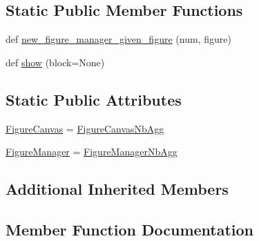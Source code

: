 \subsection*{Static Public Member Functions}
\begin{DoxyCompactItemize}
\item 
def \hyperlink{classmatplotlib_1_1backends_1_1backend__nbagg_1_1__BackendNbAgg_a2c4d1f5d23f896962ac1e1820966e93a}{new\+\_\+figure\+\_\+manager\+\_\+given\+\_\+figure} (num, figure)
\item 
def \hyperlink{classmatplotlib_1_1backends_1_1backend__nbagg_1_1__BackendNbAgg_aa50af96a7824c694dc620ac08db3de1b}{show} (block=None)
\end{DoxyCompactItemize}
\subsection*{Static Public Attributes}
\begin{DoxyCompactItemize}
\item 
\hyperlink{classmatplotlib_1_1backends_1_1backend__nbagg_1_1__BackendNbAgg_ad89ee8826e88ff62437efb785aa1bbad}{Figure\+Canvas} = \hyperlink{classmatplotlib_1_1backends_1_1backend__nbagg_1_1FigureCanvasNbAgg}{Figure\+Canvas\+Nb\+Agg}
\item 
\hyperlink{classmatplotlib_1_1backends_1_1backend__nbagg_1_1__BackendNbAgg_a9c885cb676b77a6ac7baedf4ecbb7218}{Figure\+Manager} = \hyperlink{classmatplotlib_1_1backends_1_1backend__nbagg_1_1FigureManagerNbAgg}{Figure\+Manager\+Nb\+Agg}
\end{DoxyCompactItemize}
\subsection*{Additional Inherited Members}


\subsection{Member Function Documentation}
\mbox{\label{classmatplotlib_1_1backends_1_1backend__nbagg_1_1__BackendNbAgg_a2c4d1f5d23f896962ac1e1820966e93a}} 

